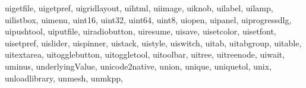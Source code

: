 {{        uigetfile,%
        uigetpref,%
        uigridlayout,%
        uihtml,%
        uiimage,%
        uiknob,%
        uilabel,%
        uilamp,%
        uilistbox,%
        uimenu,%
        uint16,%
        uint32,%
        uint64,%
        uint8,%
        uiopen,%
        uipanel,%
        uiprogressdlg,%
        uipushtool,%
        uiputfile,%
        uiradiobutton,%
        uiresume,%
        uisave,%
        uisetcolor,%
        uisetfont,%
        uisetpref,%
        uislider,%
        uispinner,%
        uistack,%
        uistyle,%
        uiswitch,%
        uitab,%
        uitabgroup,%
        uitable,%
        uitextarea,%
        uitogglebutton,%
        uitoggletool,%
        uitoolbar,%
        uitree,%
        uitreenode,%
        uiwait,%
        uminus,%
        underlyingValue,%
        unicode2native,%
        union,%
        unique,%
        uniquetol,%
        unix,%
        unloadlibrary,%
        unmesh,%
        unmkpp,%
}}
